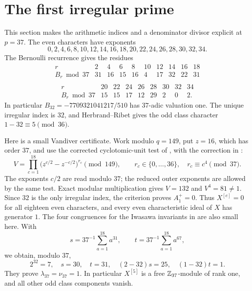 \section{The first irregular prime}
This section makes the arithmetic indices and a denominator divisor
explicit at $p=37$. The even characters have exponents
\[
 0,2,4,6,8,10,12,14,16,18,20,22,24,26,28,30,32,34.
\]
The Bernoulli recurrence gives the residues
\[
\begin{array}{c|rrrrrrrrr}
 r&2&4&6&8&10&12&14&16&18\\\hline
 B_r\bmod37&31&16&15&16&4&17&32&22&31\\
\end{array}
\]
\[
\begin{array}{c|rrrrrrrr}
 r&20&22&24&26&28&30&32&34\\\hline
 B_r\bmod37&15&15&17&12&29&2&0&2.
\end{array}
\]
In particular $B_{32}=-7709321041217/510$ has $37$-adic valuation one.
The unique irregular index is $32$, and Herbrand--Ribet gives the
odd class character $1-32\equiv5\pmod{36}$.

Here is a small Vandiver certificate. Work modulo $q=149$, put $z=16$,
which has order $37$, and use the corrected cyclotomic-unit test
of \cite[\S4, pp.~4--5]{BH}, with the correction in \cite[\S5]{HHO}:
\[
 V=\prod_{c=1}^{18}
      \bigl(z^{c/2}-z^{-c/2}\bigr)^{r_c}\pmod{149},
 \qquad r_c\in\{0,\ldots,36\},\quad r_c\equiv c^4\pmod{37}.
\]
The exponents $c/2$ are read modulo $37$; the reduced outer
exponents are allowed by the same test. Exact modular
multiplication gives $V=132$ and $V^4=81\ne1$.
Since $32$ is the only irregular index, the criterion proves
$A_1^+=0$. Thus $X^{[e]}=0$ for all eighteen even characters,
and every even characteristic ideal of $X$ has generator $1$.
The four congruences for the Iwasawa invariants in \cite[\S5]{HHO}
are also small here. With
\[
 s=37^{-1}\sum_{a=1}^{18}a^{31},\qquad
 t=37^{-1}\sum_{a=1}^{18}a^{67},
\]
we obtain, modulo $37$,
\[
 2^{32}=7,\quad s=30,\quad t=31,\quad
 (2-32)s=25,\quad(1-32)t=1.
\]
They prove $\lambda_{37}=\nu_{37}=1$. In particular
$X^{[5]}$ is a free $\mathbb Z_{37}$-module of rank one, and all other
odd class components vanish.

